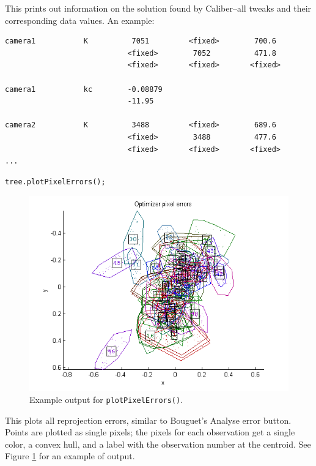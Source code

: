This prints out information on the solution found by Caliber--all tweaks and their corresponding data values. An example:

\small
\begin{verbatim}
camera1           K          7051         <fixed>        700.6      
                            <fixed>        7052          471.8      
                            <fixed>       <fixed>       <fixed>     

camera1           kc        -0.08879    
                            -11.95      

camera2           K          3488         <fixed>        689.6      
                            <fixed>        3488          477.6      
                            <fixed>       <fixed>       <fixed>
...
\end{verbatim}
\normalsize

\begin{verbatim}
tree.plotPixelErrors();
\end{verbatim}

\begin{figure}[t]
\includegraphics{figures/pixel_example}
\caption{Example output for \texttt{plotPixelErrors()}.}
\label{fig:pixel_example}
\end{figure}

This plots all reprojection errors, similar to Bouguet's \textsf{Analyse error} button.
Points are plotted as single pixels; the pixels for each observation get a single color,
a convex hull, and a label with the observation number at the centroid.
See Figure \ref{fig:pixel_example} for an example of output.

